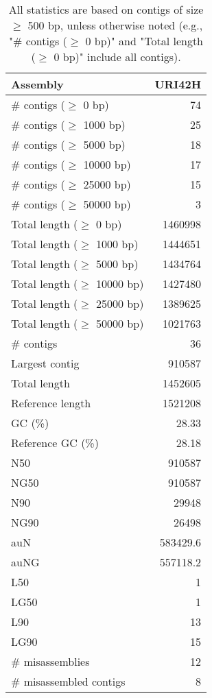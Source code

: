 \documentclass[12pt,a4paper]{article}
\begin{document}
\begin{table}[ht]
\begin{center}
\caption{All statistics are based on contigs of size $\geq$ 500 bp, unless otherwise noted (e.g., "\# contigs ($\geq$ 0 bp)" and "Total length ($\geq$ 0 bp)" include all contigs).}
\begin{tabular}{|l*{1}{|r}|}
\hline
Assembly & URI42H \\ \hline
\# contigs ($\geq$ 0 bp) & 74 \\ \hline
\# contigs ($\geq$ 1000 bp) & 25 \\ \hline
\# contigs ($\geq$ 5000 bp) & 18 \\ \hline
\# contigs ($\geq$ 10000 bp) & 17 \\ \hline
\# contigs ($\geq$ 25000 bp) & 15 \\ \hline
\# contigs ($\geq$ 50000 bp) & 3 \\ \hline
Total length ($\geq$ 0 bp) & 1460998 \\ \hline
Total length ($\geq$ 1000 bp) & 1444651 \\ \hline
Total length ($\geq$ 5000 bp) & 1434764 \\ \hline
Total length ($\geq$ 10000 bp) & 1427480 \\ \hline
Total length ($\geq$ 25000 bp) & 1389625 \\ \hline
Total length ($\geq$ 50000 bp) & 1021763 \\ \hline
\# contigs & 36 \\ \hline
Largest contig & 910587 \\ \hline
Total length & 1452605 \\ \hline
Reference length & 1521208 \\ \hline
GC (\%) & 28.33 \\ \hline
Reference GC (\%) & 28.18 \\ \hline
N50 & 910587 \\ \hline
NG50 & 910587 \\ \hline
N90 & 29948 \\ \hline
NG90 & 26498 \\ \hline
auN & 583429.6 \\ \hline
auNG & 557118.2 \\ \hline
L50 & 1 \\ \hline
LG50 & 1 \\ \hline
L90 & 13 \\ \hline
LG90 & 15 \\ \hline
\# misassemblies & 12 \\ \hline
\# misassembled contigs & 8 \\ \hline

\end{tabular}
\end{center}
\end{table}
\end{document}
